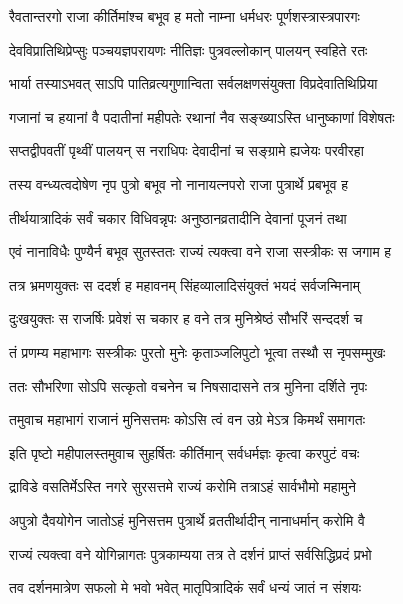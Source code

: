 \twolineshloka
{रैवतान्तरगो राजा कीर्तिमांश्च बभूव ह}
{मतो नाम्ना धर्मधरः पूर्णशस्त्रास्त्रपारगः} %

\twolineshloka
{देवविप्रातिथिप्रेप्सुः पञ्चयज्ञपरायणः}
{नीतिज्ञः पुत्रवल्लोकान् पालयन् स्वहिते रतः} %

\twolineshloka
{भार्या तस्याऽभवत् साऽपि पातिव्रत्यगुणान्विता}
{सर्वलक्षणसंयुक्ता विप्रदेवातिथिप्रिया} %

\twolineshloka
{गजानां च हयानां वै पदातीनां महीपतेः}
{रथानां नैव सङ्ख्याऽस्ति धानुष्काणां विशेषतः} %

\twolineshloka
{सप्तद्वीपवतीं पृथ्वीं पालयन् स नराधिपः}
{देवादीनां च सङ्ग्रामे ह्यजेयः परवीरहा} %

\twolineshloka
{तस्य वन्ध्यत्वदोषेण नृप पुत्रो बभूव नो}
{नानायत्नपरो राजा पुत्रार्थे प्रबभूव ह} %

\twolineshloka
{तीर्थयात्रादिकं सर्वं चकार विधिवन्नृपः}
{अनुष्ठानव्रतादीनि देवानां पूजनं तथा} %

\twolineshloka
{एवं नानाविधैः पुण्यैर्न बभूव सुतस्ततः}
{राज्यं त्यक्त्वा वने राजा सस्त्रीकः स जगाम ह} %

\twolineshloka
{तत्र भ्रमणयुक्तः स ददर्श ह महावनम्}
{सिंहव्यालादिसंयुक्तं भयदं सर्वजन्मिनाम्} %

\twolineshloka
{दुःखयुक्तः स राजर्षिः प्रवेशं स चकार ह}
{वने तत्र मुनिश्रेष्ठं सौभरिं सन्ददर्श च} %

\twolineshloka
{तं प्रणम्य महाभागः सस्त्रीकः पुरतो मुनेः}
{कृताञ्जलिपुटो भूत्वा तस्थौ स नृपसम्मुखः} %

\twolineshloka
{ततः सौभरिणा सोऽपि सत्कृतो वचनेन च}
{निषसादासने तत्र मुनिना दर्शिते नृपः} %

\twolineshloka
{तमुवाच महाभागं राजानं मुनिसत्तमः}
{कोऽसि त्वं वन उग्रे मेऽत्र किमर्थं समागतः} %

\twolineshloka
{इति पृष्टो महीपालस्तमुवाच सुहर्षितः}
{कीर्तिमान् सर्वधर्मज्ञः कृत्वा करपुटं वचः} %


\twolineshloka
{द्राविडे वसतिर्मेऽस्ति नगरे सुरसत्तमे}
{राज्यं करोमि तत्राऽहं सार्वभौमो महामुने} %

\twolineshloka
{अपुत्रो दैवयोगेन जातोऽहं मुनिसत्तम}
{पुत्रार्थे व्रततीर्थादीन् नानाधर्मान् करोमि वै} %

\twolineshloka
{राज्यं त्यक्त्वा वने योगिन्नागतः पुत्रकाम्यया}
{तत्र ते दर्शनं प्राप्तं सर्वसिद्धिप्रदं प्रभो} %

\twolineshloka
{तव दर्शनमात्रेण सफलो मे भवो भवेत्}
{मातृपित्रादिकं सर्वं धन्यं जातं न संशयः} %

